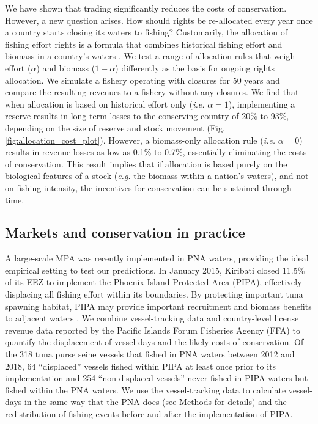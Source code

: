 \documentclass[12pt]{article}
\begin{document}
We have shown that trading significantly reduces the costs of conservation. However, a new question arises. How should rights be re-allocated every year once a country starts closing its waters to fishing? Customarily, the allocation of fishing effort rights is a formula that combines historical fishing effort and biomass in a country's waters \cite{havice_2013}. We test a range of allocation rules that weigh effort ($\alpha$) and biomass ($1 - \alpha$) differently as the basis for ongoing rights allocation. We simulate a fishery operating with closures for 50 years and compare the resulting revenues to a fishery without any closures. We find that when allocation is based on historical effort only (\emph{i.e.} $\alpha = 1$), implementing a reserve results in long-term losses to the conserving country of 20\% to 93\%, depending on the size of reserve and stock movement (Fig. \ref{fig:allocation_cost_plot}). However, a biomass-only allocation rule (\emph{i.e.} $\alpha = 0$) results in revenue losses as low as 0.1\% to 0.7\%, essentially eliminating the costs of conservation. This result implies that if allocation is based purely on the biological features of a stock (\emph{e.g.} the biomass within a nation's waters), and not on fishing intensity, the incentives for conservation can be sustained through time.

\subsection{Markets and conservation in practice}

A large-scale MPA was recently implemented in PNA waters, providing the ideal empirical setting to test our predictions. In January 2015, Kiribati closed 11.5\% of its EEZ to implement the Phoenix Island Protected Area (PIPA), effectively displacing all fishing effort within its boundaries\cite{mccauley_2016,mcdermott_2018}. By protecting important tuna spawning habitat, PIPA may provide important recruitment and biomass benefits to adjacent waters \cite{hernndez_2019}. We combine vessel-tracking data \cite{kroodsma_2018} and country-level license revenue data reported by the Pacific Islands Forum Fisheries Agency (FFA) \cite{ffa_2017} to quantify the displacement of vessel-days and the likely costs of conservation. Of the 318 tuna purse seine vessels that fished in PNA waters between 2012 and 2018, 64 ``displaced'' vessels fished within PIPA at least once prior to its implementation and 254 ``non-displaced vessels'' never fished in PIPA waters but fished within the PNA waters. We use the vessel-tracking data to calculate vessel-days in the same way that the PNA does (see Methods for details) and the redistribution of fishing events before and after the implementation of PIPA.
\end{document}
